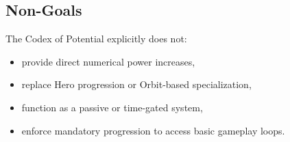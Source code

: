 \subsection{Non-Goals}

The Codex of Potential explicitly does not:
\begin{itemize}
	\item provide direct numerical power increases,
	\item replace Hero progression or Orbit-based specialization,
	\item function as a passive or time-gated system,
	\item enforce mandatory progression to access basic gameplay loops.
\end{itemize}
